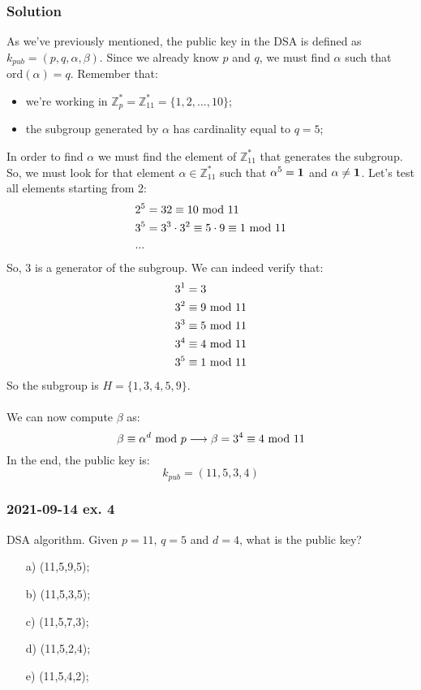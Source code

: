 \subsubsection*{Solution}
As we've previously mentioned, the public key in the DSA is defined as $k_{pub}=(p,q,\alpha,\beta)$. Since we already know $p$ and $q$, we must find $\alpha$ such that $\text{ord}(\alpha)=q$. Remember that:
\begin{itemize}
    \item we're working in $\mathbb{Z}_p^*=\mathbb{Z}_{11}^*=\{1,2,...,10\}$;
    \item the subgroup generated by $\alpha$ has cardinality equal to $q=5$;
\end{itemize}
In order to find $\alpha$ we must find the element of $\mathbb{Z}_{11}^*$ that generates the subgroup. So, we must look for that element $\alpha\in \mathbb{Z}_{11}^*$ such that $\alpha^5=\textbf{1}$ and $\alpha\not=\textbf{1}$. Let's test all elements starting from 2:
\begin{align*}
    &2^5=32\equiv10\text{ mod }11\\
    &3^5=3^3\cdot3^2\equiv5\cdot9\equiv1\text{ mod }11\\
    &...
\end{align*}
So, 3 is a generator of the subgroup. We can indeed verify that:
\begin{align*}
    &3^1=3\\
    &3^2\equiv9\text{ mod }11\\
    &3^3\equiv5\text{ mod }11\\
    &3^4\equiv4\text{ mod }11\\
    &3^5\equiv1\text{ mod }11
\end{align*}
So the subgroup is $H=\{1,3,4,5,9\}$.\\\\
We can now compute $\beta$ as:
$$\beta\equiv\alpha^d\text{ mod } p\longrightarrow\beta=3^4\equiv 4\text{ mod } 11$$
In the end, the public key is:
$$k_{pub}=(11,5,3,4)$$

\newpage
\subsubsection{2021-09-14 ex. 4}
DSA algorithm. Given $p=11$, $q=5$ and $d=4$,  what is the public key?
\begin{itemize}
    \item[a)] (11,5,9,5);
    \item[b)] (11,5,3,5);
    \item[c)] (11,5,7,3);
    \item[d)] (11,5,2,4);
    \item[e)] (11,5,4,2);
\end{itemize}

